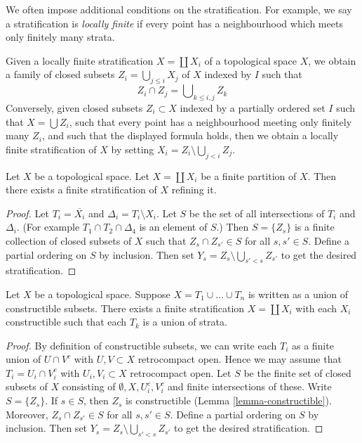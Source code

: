\noindent
We often impose additional conditions on the stratification.
For example, we say a stratification is {\it locally finite}
if every point has a neighbourhood which meets only finitely
many strata.

\begin{remark}
\label{remark-locally-finite-stratification}
Given a locally finite stratification $X = \coprod X_i$ of a
topological space $X$, we obtain a family of closed subsets
$Z_i = \bigcup_{j \leq i} X_j$ of $X$ indexed by $I$ such that
$$
Z_i \cap Z_j = \bigcup\nolimits_{k \leq i, j} Z_k
$$
Conversely, given closed subsets $Z_i \subset X$ indexed by a partially
ordered set $I$ such that $X = \bigcup Z_i$, such that every point
has a neighbourhood meeting only finitely many $Z_i$, and such that
the displayed formula holds, then we obtain a locally finite
stratification of $X$ by setting $X_i = Z_i \setminus \bigcup_{j < i} Z_j$.
\end{remark}

\begin{lemma}
\label{lemma-partition-refined-by-stratification}
Let $X$ be a topological space. Let $X = \coprod X_i$ be a finite partition
of $X$. Then there exists a finite stratification of $X$ refining it.
\end{lemma}

\begin{proof}
Let $T_i = \overline{X_i}$ and $\Delta_i = T_i \setminus X_i$.
Let $S$ be the set of all intersections of $T_i$ and $\Delta_i$.
(For example $T_1 \cap T_2 \cap \Delta_4$ is an element of $S$.)
Then $S = \{Z_s\}$ is a finite collection of closed subsets of $X$ such that
$Z_s \cap Z_{s'} \in S$ for all $s, s' \in S$. Define a partial ordering
on $S$ by inclusion. Then set $Y_s = Z_s \setminus \bigcup_{s' < s} Z_{s'}$
to get the desired stratification.
\end{proof}

\begin{lemma}
\label{lemma-constructible-partition-refined-by-stratification}
Let $X$ be a topological space. Suppose $X = T_1 \cup \ldots \cup T_n$
is written as a union of constructible subsets. There exists a finite
stratification $X = \coprod X_i$ with each $X_i$ constructible
such that each $T_k$ is a union of strata.
\end{lemma}

\begin{proof}
By definition of constructible subsets, we can write each $T_i$ as a
finite union of $U \cap V^c$ with $U, V \subset X$ retrocompact open.
Hence we may assume that $T_i = U_i \cap V_i^c$
with $U_i, V_i \subset X$ retrocompact open. Let $S$ be the
finite set of closed subsets of $X$ consisting of
$\emptyset, X, U_i^c, V_i^c$ and finite intersections of these.
Write $S = \{Z_s\}$. If $s \in S$, then $Z_s$ is constructible
(Lemma \ref{lemma-constructible}).
Moreover, $Z_s \cap Z_{s'} \in S$ for all $s, s' \in S$.
Define a partial ordering on $S$ by inclusion. Then set
$Y_s = Z_s \setminus \bigcup_{s' < s} Z_{s'}$
to get the desired stratification.
\end{proof}

